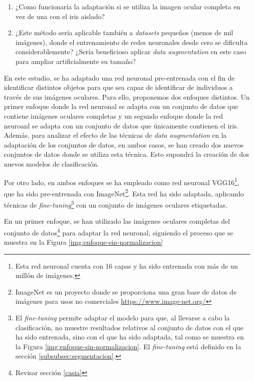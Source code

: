 \begin{enumerate}
    \item ¿Como funcionaría la adaptación si se utiliza la imagen ocular completa en vez de una con el iris aislado?
    \item ¿Este método sería aplicable también a \textit{datasets} pequeños (menos de mil imágenes), donde el entrenamiento de redes neuronales desde cero se dificulta considerablemente? ¿Sería beneficioso aplicar \textit{data augmentation} en este caso para ampliar artificialmente su tamaño?
\end{enumerate}


En este estudio, se ha adaptado una red neuronal pre-entrenada con el fin de identificar distintos objetos para que sea capaz de identificar de individuos a través de sus imágenes oculares. Para ello, proponemos dos enfoques distintos. Un primer enfoque donde la red neuronal se adapta con un conjunto de datos que contiene imágenes oculares completas y un segundo enfoque donde la red neuroanl se adapta con un conjunto de datos que únicamente contienen el iris. 
Además, para analizar el efecto de las técnicas de \textit{data augmentation} en la adaptación de los conjuntos de datos, en ambos casos, se han creado dos nuevos conjuntos de datos donde se utiliza esta técnica. Esto supondrá la creación de dos nuevos modelos de clasificación.

Por otro lado, en ambos enfoques se ha empleado como red neuronal VGG16\footnote{Esta red neuronal cuenta con 16 capas y ha sido entrenada con más de un millón de imágenes.}, que ha sido pre-entrenada con ImageNet\footnote{ImageNet es un proyecto donde se proporciona 
una gran base de datos de imágenes para usos no comerciales \url{https://www.image-net.org/}}. Esta red ha sido adaptada, aplicando técnicas de \textit{fine-tuning}\footnote{El \textit{fine-tuning} 
permite adaptar el modelo para que, al llevarse a cabo la clasificación, no muestre resultados relativos al conjunto de datos con el que ha sido entrenada, sino con el que ha sido adaptada, tal como se muestra en la Figura \ref{img:enfoque-sin-normalizacion}. El \textit{fine-tuning} está definido en la sección \ref{subsubsec:segmentacion}.}
 con un conjunto de imágenes oculares etiquetadas.

En un primer enfoque, se han utilizado las imágenes oculares completas del conjunto de datos\footnote{Revisar sección \ref{casia}} para adaptar la red neuronal, siguiendo el proceso que se muestra en la Figura \ref{img:enfoque-sin-normalizacion}

